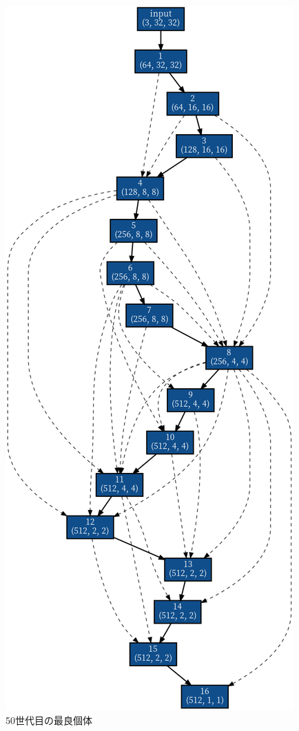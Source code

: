 \documentclass[twocolumn]{jarticle}     %
\begin{document}
\begin{figure}[tb]
\begin{minipage}{0.33\hsize}
\begin{center}
 		\caption{50世代目の最良個体}
 		\label{fig:graph50}
 	\end{center}
 \end{minipage}
 \begin{minipage}{0.33\hsize}
 	\begin{center}
 		\includegraphics[clip,scale=0.2]{100.png}

\end{center}
\end{minipage}
\end{figure}
\end{document}

